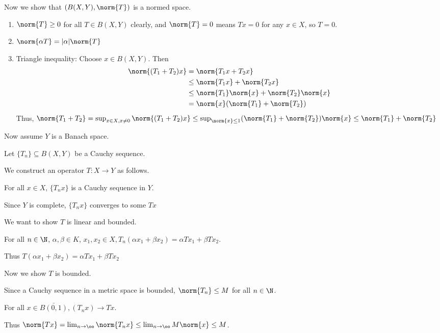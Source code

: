 \documentclass[x11names,reqno,14pt]{extarticle}
\begin{document}
Now we show that $(B(X, Y), \norm{T})$ is a normed space. 

\begin{enumerate}

\item $\norm{T} \geq 0$ for all $T \in B(X, Y)$ clearly, and $\norm{T} = 0$ means $Tx = 0$ for any $x \in X$, so $T = 0$. 

\item $\norm{\alpha T} = |\alpha|\norm{T}$

\item Triangle inequality: Choose $x \in B(X, Y)$. Then
\begin{align*}
\norm{(T_1 + T_2)x} & = \norm{T_1x + T_2x} \\
						  & \leq \norm{T_1x} + \norm{T_2x} \\
						  & \leq \norm{T_1}\norm{x} + \norm{T_2}\norm{x}\\
						  & = \norm{x}(\norm{T_1} + \norm{T_2}) \\
\end{align*}
Thus, $\norm{T_1 + T_2} = \sup_{x\in X, x\neq 0}\norm{(T_1 + T_2)x} \leq \sup_{\norm{x}\leq 1}(\norm{T_1} + \norm{T_2})\norm{x} \leq \norm{T_1} + \norm{T_2}$

\end{enumerate}

Now assume $Y$ is a Banach space. 

Let $\{T_n\} \subseteq B(X, Y)$ be a Cauchy sequence.

We construct an operator $T:X\to Y$ as follows. 

For all $x\in X$, $\{T_nx\}$ is a Cauchy sequence in $Y$. 

Since $Y$ is complete, $\{T_nx\}$ converges to some $Tx$

We want to show $T$ is linear and bounded. 

For all $n \in \N$, $\alpha,\beta\in K$, $x_1, x_2 \in X, T_n(\alpha x_1 + \beta x_2) = \alpha Tx_1 + \beta Tx_2$. 

Thus $T(\alpha x_1 + \beta x_2) = \alpha Tx_1 + \beta Tx_2$

Now we show $T$ is bounded.

Since a Cauchy sequence in a metric space is bounded, $\norm{T_n} \leq M$ for all $n \in \N$. 

For all $x \in \bar{B(0, 1)}, (T_nx)\to Tx$. 

Thus $\norm{Tx} = \lim_{n\to\oo}\norm{T_nx} \leq \lim_{n\to\oo}M\norm{x} \leq M$. 
\end{document}

